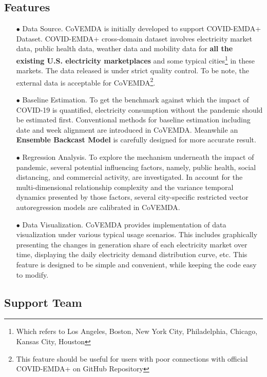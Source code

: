 \documentclass[10pt]{article}
\newcommand{\covemda}{CoVEMDA}
\numberwithin{equation}{section}
\numberwithin{table}{section}
\numberwithin{figure}{section}
\begin{document}
\subsection{Features}
\begin{itemize}
    \item[$\bullet$] Data Source. \covemda{} is initially developed to support COVID-EMDA+ Dataset. COVID-EMDA+ cross-domain dataset involves electricity market data, public health data, weather data and mobility data for \textbf{all the existing U.S. electricity marketplaces} and some typical cities\footnote{Which refers to Los Angeles, Boston, New York City, Philadelphia, Chicago, Kansas City, Houston} in these markets. The data released is under strict quality control. To be note, the external data is acceptable for \covemda{}\footnote{This feature should be useful for users with poor connections with official COVID-EMDA+ on GitHub Repository}.
    
    \item[$\bullet$] Baseline Estimation. To get the benchmark against which the impact of COVID-19 is quantified, electricity consumption without the pandemic should be estimated first. Conventional methods for baseline estimation including date and week alignment are introduced in \covemda{}. Meanwhile an \textbf{Ensemble Backcast Model} is carefully designed for more accurate result.
    
    \item[$\bullet$] Regression Analysis. To explore the mechanism underneath the impact of pandemic, several potential influencing factors, namely, public health, social distancing, and commercial activity, are investigated. In account for the multi-dimensional relationship complexity and the variance temporal dynamics presented by those factors, several city-specific restricted vector autoregression models are calibrated in \covemda{}.
    
    \item[$\bullet$] Data Visualization. \covemda{} provides implementation of data visualization under various typical usage scenarios. This includes graphically presenting the changes in generation share of each electricity market over time, displaying the daily electricity demand distribution curve, etc. This feature is designed to be simple and convenient, while keeping the code easy to modify.
    
\end{itemize}

\newpage
\subsection{Support Team}
\end{document}
